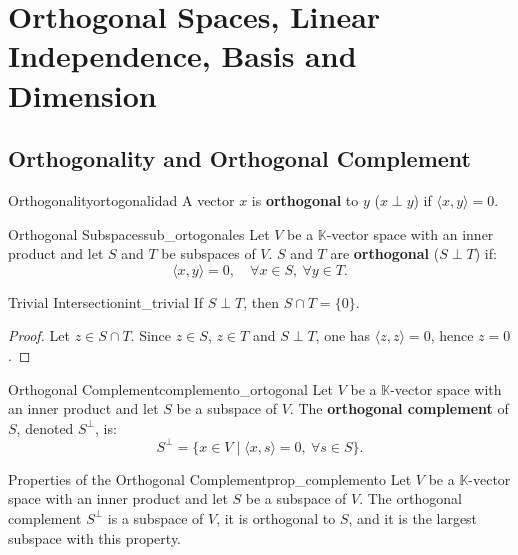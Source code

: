 \documentclass[11pt, a4paper]{article}
\begin{document}
\newpage

\section{Orthogonal Spaces, Linear Independence, Basis and Dimension}

\subsection{Orthogonality and Orthogonal Complement}

\begin{definicion}{Orthogonality}{ortogonalidad}
A vector $x$ is \textbf{orthogonal} to $y$ ($x \perp y$) if $\langle x, y \rangle = 0$.
\end{definicion}

\begin{definicion}{Orthogonal Subspaces}{sub_ortogonales}
Let $V$ be a $\mathbb{K}$-vector space with an inner product and let $S$ and $T$ be subspaces of $V$.
$S$ and $T$ are \textbf{orthogonal} ($S \perp T$) if:
\[
\langle x, y \rangle = 0, \quad \forall x \in S, \ \forall y \in T.
\]
\end{definicion}

\begin{proposicion}{Trivial Intersection}{int_trivial}
If $S \perp T$, then $S \cap T = \{0\}$.
\end{proposicion}

\begin{proof}
Let $z \in S \cap T$. Since $z \in S$, $z \in T$ and $S \perp T$, one has $\langle z, z \rangle = 0$, hence $z = 0$.
\end{proof}

\begin{definicion}{Orthogonal Complement}{complemento_ortogonal}
Let $V$ be a $\mathbb{K}$-vector space with an inner product and let $S$ be a subspace of $V$. The \textbf{orthogonal complement} of $S$, denoted $S^\perp$, is:
\[
S^\perp = \{ x \in V \mid \langle x, s \rangle = 0, \ \forall s \in S \}.
\]
\end{definicion}

\begin{proposicion}{Properties of the Orthogonal Complement}{prop_complemento}
Let $V$ be a $\mathbb{K}$-vector space with an inner product and let $S$ be a subspace of $V$. The orthogonal complement $S^\perp$ is a subspace of $V$, it is orthogonal to $S$, and it is the largest subspace with this property.
\end{proposicion}
\end{document}
